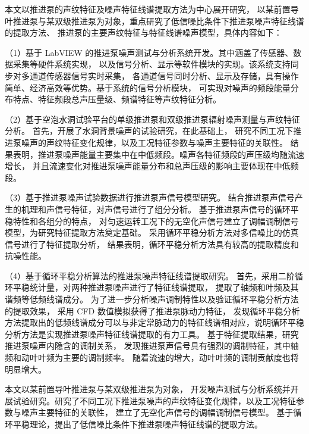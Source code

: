 本文以推进泵的声纹特征及噪声特征线谱提取方法为中心展开研究，
以某前置导叶推进泵与某双级推进泵为对象，重点研究了低信噪比条件下推进泵噪声特征线谱的提取方法、
推进泵的主要声纹特征与特征线谱噪声模型，具体内容如下：

（1）基于 LabVIEW 的推进泵噪声测试与分析系统开发。其中涵盖了传感器、数据采集等硬件系统实现，
以及信号分析、显示等软件模块的实现。该系统支持同步对多通道传感器信号实时采集，
各通道信号同时分析、显示及存储，具有操作简单、经济高效等优势。基于系统的信号分析模块，
可实现对噪声的频段能量分布特点、特征频段总声压量级、频谱特征等声纹特征分析。

（2）基于空泡水洞试验平台的单级推进泵和双级推进泵辐射噪声测量与声纹特征分析。
首先，开展了水洞背景噪声的试验研究，在此基础上，
研究不同工况下推进泵噪声的声纹特征变化规律，以及工况特征参数与噪声主要特征的关联性。
结果表明，推进泵噪声能量主要集中在中低频段。噪声各特征频段的声压级均随流速增长，
并且流速变化对推进泵噪声能量分布和总声压级的影响主要体现在中低频段。

（3）基于推进泵噪声试验数据进行推进泵声信号模型研究。
结合推进泵声信号产生的机理和声信号特征，对声信号进行了组分分析。
基于推进泵声信号的循环平稳特性和各组分的特点，
对匀速运转工况下的无空化声信号建立了调幅调制信号模型，为研究特征提取方法奠定基础。
采用循环平稳分析方法对多信噪比的仿真信号进行了特征提取分析，
结果表明，循环平稳分析方法具有较高的提取精度和抗噪性能。

（4）基于循环平稳分析算法的推进泵噪声特征线谱提取研究。
首先，采用二阶循环平稳统计量，对两种推进泵噪声进行了特征线谱提取，
提取了轴频和叶频及其谐频等低频线谱成分。
为了进一步分析噪声调制特性以及验证循环平稳分析方法的提取效果，
采用 CFD 数值模拟获得了推进泵脉动力特征，
发现循环平稳分析方法提取出的低频线谱成分可以与非定常脉动力的特征线谱相对应，说明循环平稳分析方法是实现推进泵噪声特征线谱提取的有力工具。
基于特征提取结果，研究推进泵噪声内隐含的调制关系，
发现推进泵声信号具有强烈的调制特征，其中轴频和动叶叶频为主要的调制频率。
随着流速的增大，动叶叶频的调制贡献度也将明显增大。

本文以某前置导叶推进泵与某双级推进泵为对象，
开发噪声测试与分析系统并开展试验研究。研究了不同工况下推进泵噪声的声纹特征变化规律，以及工况特征参数与噪声主要特征的关联性，
建立了无空化声信号的调幅调制信号模型。
基于循环平稳理论，提出了低信噪比条件下推进泵噪声特征线谱的提取方法。

\quad

